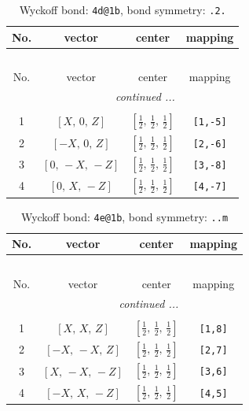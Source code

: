 \documentclass[fleqn,8pt]{jsarticle}
\begin{document}
\begin{longtable}{cccc}
\caption{Wyckoff bond: {\tt 4d@1b}, bond symmetry: {\tt .2.}}
 \\
 \hline \hline
No. & vector & center & mapping \\ \hline \endfirsthead

\multicolumn{3}{l}{\tablename\ \thetable{}} \\
 \hline \hline
No. & vector & center & mapping \\ \hline \endhead

 \hline \hline
\multicolumn{3}{r}{\footnotesize\it continued ...} \\ \endfoot

 \hline \hline
\multicolumn{3}{r}{} \\ \endlastfoot

1 & $\left[ X,\, 0,\, Z \right]$ & $\left[ \frac{1}{2},\, \frac{1}{2},\, \frac{1}{2} \right]$ & {\tt [1,-5]} \\ \hline
2 & $\left[ - X,\, 0,\, Z \right]$ & $\left[ \frac{1}{2},\, \frac{1}{2},\, \frac{1}{2} \right]$ & {\tt [2,-6]} \\ \hline
3 & $\left[ 0,\, - X,\, - Z \right]$ & $\left[ \frac{1}{2},\, \frac{1}{2},\, \frac{1}{2} \right]$ & {\tt [3,-8]} \\ \hline
4 & $\left[ 0,\, X,\, - Z \right]$ & $\left[ \frac{1}{2},\, \frac{1}{2},\, \frac{1}{2} \right]$ & {\tt [4,-7]} \\
\end{longtable}
\renewcommand{\arraystretch}{1.2}
\begin{longtable}{cccc}
\caption{Wyckoff bond: {\tt 4e@1b}, bond symmetry: {\tt ..m}}
 \\
 \hline \hline
No. & vector & center & mapping \\ \hline \endfirsthead

\multicolumn{3}{l}{\tablename\ \thetable{}} \\
 \hline \hline
No. & vector & center & mapping \\ \hline \endhead

 \hline \hline
\multicolumn{3}{r}{\footnotesize\it continued ...} \\ \endfoot

 \hline \hline
\multicolumn{3}{r}{} \\ \endlastfoot

1 & $\left[ X,\, X,\, Z \right]$ & $\left[ \frac{1}{2},\, \frac{1}{2},\, \frac{1}{2} \right]$ & {\tt [1,8]} \\ \hline
2 & $\left[ - X,\, - X,\, Z \right]$ & $\left[ \frac{1}{2},\, \frac{1}{2},\, \frac{1}{2} \right]$ & {\tt [2,7]} \\ \hline
3 & $\left[ X,\, - X,\, - Z \right]$ & $\left[ \frac{1}{2},\, \frac{1}{2},\, \frac{1}{2} \right]$ & {\tt [3,6]} \\ \hline
4 & $\left[ - X,\, X,\, - Z \right]$ & $\left[ \frac{1}{2},\, \frac{1}{2},\, \frac{1}{2} \right]$ & {\tt [4,5]} \\
\end{longtable}
\end{document}
